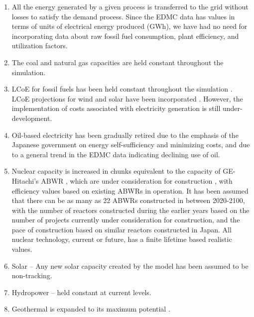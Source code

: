\documentclass[14pt,a4paper]{article} %
\begin{document}
\begin{enumerate}

\item All the energy generated by a given process is transferred to the grid without losses to satisfy the demand process. Since the \gls{EDMC} data has values in terms of units of electrical energy produced (GWh), we have had no need for incorporating data about raw fossil fuel consumption, plant efficiency, and utilization factors.

\item The coal and natural gas capacities are held constant throughout the simulation.

\item \gls{LCoE} for fossil fuels has been held constant throughout the simulation \cite{chapman_energy_2018} \cite{noauthor_lazards_2017} \cite{noauthor_iea_2017}. \gls{LCoE} projections for wind and solar have been incorporated \cite{noauthor_lazards_2017}. However, the implementation of costs associated with electricity generation is still under-development. 

\item Oil-based electricity has been gradually retired due to the emphasis of the Japanese government on energy self-sufficiency and minimizing costs, and due to a general trend in the \gls{EDMC} data \cite{noauthor_energy_2018} indicating declining use of oil.

\item Nuclear capacity is increased in chunks equivalent to the capacity of GE-Hitachi's \gls{ABWR} \cite{ge_advanced_2007}, which are under consideration for construction \cite{noauthor_electricity_2017}, with efficiency values based on existing \gls{ABWR}s in operation. It has been assumed that there can be as many as 22 \gls{ABWR}s constructed in between 2020-2100, with the number of reactors constructed during the earlier years based on the number of projects currently under consideration for construction, and the pace of construction based on similar reactors constructed in Japan. All nuclear technology, current or future, has a finite lifetime based realistic values.

\item Solar – Any new solar capacity created by the model has been assumed to be non-tracking.

\item Hydropower – held constant at current levels.

\item Geothermal is expanded to its maximum potential \cite{noauthor_geothermal_2018}.


\end{enumerate}
\end{document}
